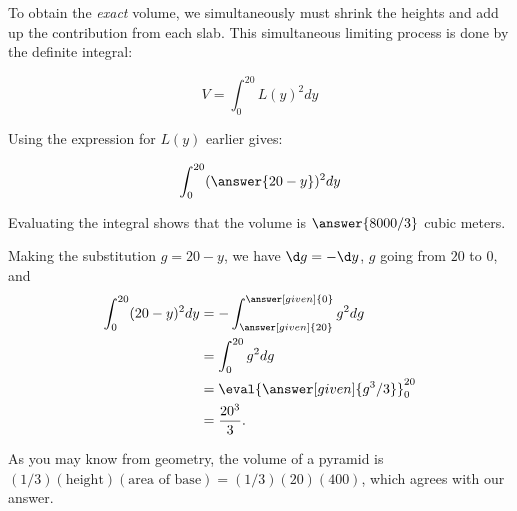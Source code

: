 \documentclass{ximera}
\begin{document}
\begin{exercise}
To obtain the \emph{exact} volume, we simultaneously must shrink the heights and add up the contribution from each slab.  This simultaneous limiting process is done by the definite integral:

\[
V = \int_{0}^{20} L(y)^2 dy
\]

Using the expression for $L(y)$ earlier gives:

\[
\int_0^{20} (\answer{20-y})^2 dy
\]

Evaluating the integral shows that the volume is $\answer{8000/3}$ cubic meters.

\begin{hint}

Making the substitution $g = 20-y $, we have $\d g = - \d y$, $g$ going from $20$ to $0$, and 
	\begin{align*}
	\int_0^{20} (20-y)^2 dy &= -\int_{\answer[given]{20}}^{\answer[given]{0}} g^2 dg\\
		&= \int_0^{20} g^2 dg\\
		&= \eval{\answer[given]{g^3/3}}_0^{20}\\
		&= \frac{20^3}{3}.
	\end{align*}

\end{hint}

As you may know from geometry, the volume of a pyramid is
$(1/3)(\text{height})(\text{area of base})=(1/3)(20)(400)$, which
agrees with our answer.


\end{exercise}
\end{document}
